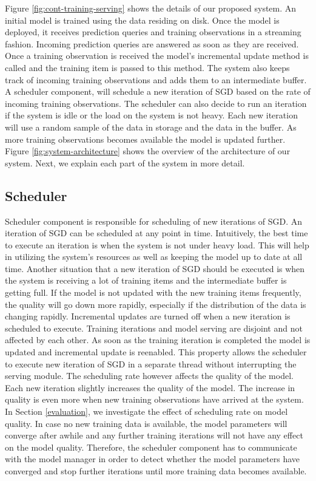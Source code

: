 \documentclass{sig-alternate-05-2015}
\begin{document}
Figure \ref{fig:cont-training-serving} shows the details of our proposed system.
An initial model is trained using the data residing on disk.
Once the model is deployed, it receives prediction queries and training observations in a streaming fashion.
Incoming prediction queries are answered as soon as they are received.
Once a training observation is received the model's incremental update method is called and the training item is passed to this method.
The system also keeps track of incoming training observations and adds them to an intermediate buffer.
A scheduler component, will schedule a new iteration of SGD based on the rate of incoming training observations. 
The scheduler can also decide to run an iteration if the system is idle or the load on the system is not heavy. 
Each new iteration will use a random sample of the data in storage and the data in the buffer. 
As more training observations becomes available the model is updated further.
Figure \ref{fig:system-architecture} shows the overview of the architecture of our system.
Next, we explain each part of the system in more detail.

\subsection{Scheduler}\label{scheduler}
Scheduler component is responsible for scheduling of new iterations of SGD.
An iteration of SGD can be scheduled at any point in time.
Intuitively, the best time to execute an iteration is when the system is not under heavy load.
This will help in utilizing the system's resources as well as keeping the model up to date at all time.
Another situation that a new iteration of SGD should be executed is when the system is receiving a lot of training items and the intermediate buffer is getting full.
If the model is not updated with the new training items frequently, the quality will go down more rapidly, especially if the distribution of the data is changing rapidly.
Incremental updates are turned off when a new iteration is scheduled to execute.
Training iterations and model serving are disjoint and not affected by each other.
As soon as the training iteration is completed the model is updated and incremental update is reenabled.
This property allows the scheduler to execute new iteration of SGD in a separate thread without interrupting the serving module.
The scheduling rate however affects the quality of the model.
Each new iteration slightly increases the quality of the model.
The increase in quality is even more when new training observations have arrived at the system.
In Section \ref{evaluation}, we investigate the effect of scheduling rate on model quality.
In case no new training data is available, the model parameters will converge after awhile and any further training iterations will not have any effect on the model quality.
Therefore, the scheduler component has to communicate with the model manager in order to detect whether the model parameters have converged and stop further iterations until more training data becomes available.
\end{document}
